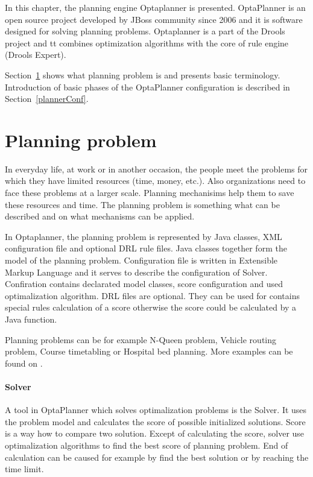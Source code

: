 In this chapter, the planning engine Optaplanner is presented. OptaPlanner is an open source project developed by JBoss community since 2006 and it is software designed for solving planning problems. Optaplanner is a part of the Drools project and tt combines optimization algorithms with the core of rule engine (Drools Expert).

Section~\ref{planningProblem} shows what planning problem is and presents basic terminology. Introduction of basic phases of the OptaPlanner configuration is described in Section~\ref{plannerConf}. 

\section{Planning problem}\label{planningProblem}
In everyday life, at work or in another occasion, the people meet the problems for which they have limited resources (time, money, etc.). Also organizations need to face these problems at a larger scale. Planning mechanisims help them to save these resources and time. The planning problem is something what can be described and on what mechanisms can be applied.

In Optaplanner, the planning problem is represented by Java classes, XML configuration file and optional DRL rule files. Java classes together form the model of the planning problem. Configuration file is written in Extensible Markup Language and it serves to describe the configuration of Solver. Confiration contains declarated model classes, score configuration and used optimalization algorithm. DRL files are optional. They can be used for contains special rules calculation of a score otherwise the score could be calculated by a Java function.

Planning problems can be for example N-Queen problem, Vehicle routing problem, Course timetabling or Hospital bed planning. More examples can be found on \cite{}.

\paragraph{Solver}
A tool in OptaPlanner which solves optimalization problems is the Solver. It uses the problem model and calculates the score of possible initialized solutions. Score is a way how to compare two solution. Except of calculating the score, solver use optimalization algorithms to find the best score of planning problem. End of calculation can be caused for example by find the best solution or by reaching the time limit.

